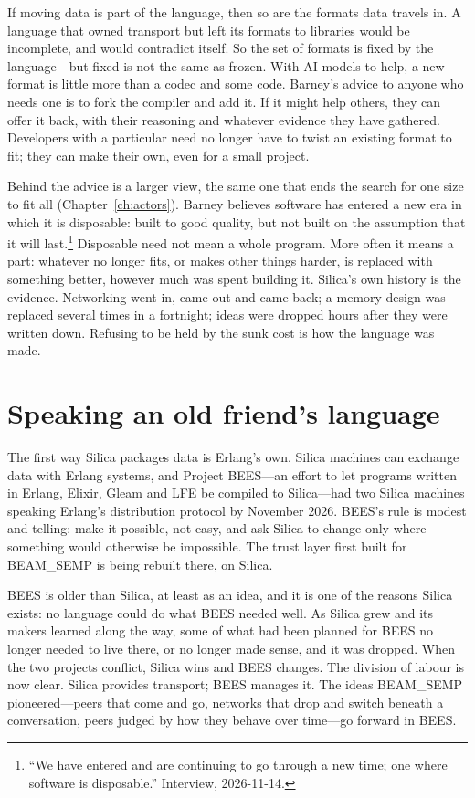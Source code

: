 If moving data is part of the language, then so are the formats data travels
in. A language that owned transport but left its formats to libraries would be
incomplete, and would contradict itself. So the set of formats is fixed by the
language---but fixed is not the same as frozen. With AI models to help, a new
format is little more than a codec and some code. Barney's advice to anyone who
needs one is to fork the compiler and add it. If it might help others, they can
offer it back, with their reasoning and whatever evidence they have gathered.
Developers with a particular need no longer have to twist an existing format to
fit; they can make their own, even for a small project.

Behind the advice is a larger view, the same one that ends the search for one
size to fit all (Chapter~\ref{ch:actors}). Barney believes software has entered
a new era in which it is disposable: built to good quality, but not built on the
assumption that it will last.\footnote{``We have entered and are continuing to
go through a new time; one where software is disposable.'' Interview,
2026-11-14.} Disposable need not mean a whole program. More often it means a
part: whatever no longer fits, or makes other things harder, is replaced with
something better, however much was spent building it. Silica's own history is
the evidence. Networking went in, came out and came back; a memory design was
replaced several times in a fortnight; ideas were dropped hours after they were
written down. Refusing to be held by the sunk cost is how the language was made.

\section{Speaking an old friend's language}

The first way Silica packages data is Erlang's own. Silica machines can
exchange data with Erlang systems, and Project BEES---an effort to let programs
written in Erlang, Elixir, Gleam and LFE be compiled to Silica---had two Silica
machines speaking Erlang's distribution protocol by November 2026. BEES's rule
is modest and telling: make it possible, not easy, and ask Silica to change
only where something would otherwise be impossible. The trust layer first built
for BEAM\_SEMP is being rebuilt there, on Silica.

BEES is older than Silica, at least as an idea, and it is one of the reasons
Silica exists: no language could do what BEES needed well. As Silica grew and
its makers learned along the way, some of what had been planned for BEES no
longer needed to live there, or no longer made sense, and it was dropped. When
the two projects conflict, Silica wins and BEES changes. The division of labour
is now clear. Silica provides transport; BEES manages it. The ideas BEAM\_SEMP
pioneered---peers that come and go, networks that drop and switch beneath a
conversation, peers judged by how they behave over time---go forward in BEES.

